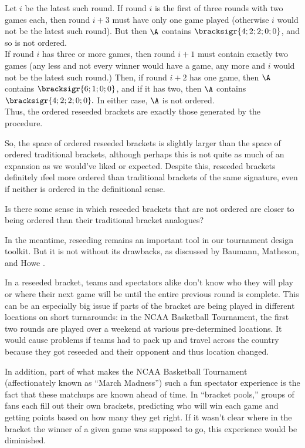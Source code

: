 {{        Let $i$ be the latest such round. If round $i$ is the first of three rounds with two games each, then round $i+3$ must have only one game played (otherwise $i$ would not be the latest such round). But then $\A$ contains $\bracksigr{4;2;2;0;0}$, and so is not ordered.\\
        
        If round $i$ has three or more games, then round $i+1$ must contain exactly two games (any less and not every winner would have a game, any more and $i$ would not be the latest such round.) Then, if round $i+2$ has one game, then $\A$ contains $\bracksigr{6;1;0;0}$, and if it has two, then $\A$ contains $\bracksigr{4;2;2;0;0}.$ In either case, $\A$ is not ordered.\\

        Thus, the ordered reseeded brackets are exactly those generated by the procedure.
    }{}

    So, the space of ordered reseeded brackets is slightly larger than the space of ordered traditional brackets, although perhaps this is not quite as much of an expansion as we would've liked or expected. Despite this, reseeded brackets definitely \i{feel} more ordered than traditional brackets of the same signature, even if neither is ordered in the definitional sense.

    \begin{oq}{}{}
        Is there some sense in which reseeded brackets that are not ordered are closer to being ordered than their traditional bracket analogues?
    \end{oq}

    In the meantime, reseeding remains an important tool in our tournament design toolkit. But it is not without its drawbacks, as discussed by Baumann, Matheson, and Howe \cite{reseeding_issues}. 

    In a reseeded bracket, teams and spectators alike don't know who they will play or where their next game will be until the entire previous round is complete. This can be an especially big issue if parts of the bracket are being played in different locations on short turnarounds: in the NCAA Basketball Tournament, the first two rounds are played over a weekend at various pre-determined locations. It would cause problems if teams had to pack up and travel across the country because they got reseeded and their opponent and thus location changed.

    In addition, part of what makes the NCAA Basketball Tournament (affectionately known as ``March Madness'') such a fun spectator experience is the fact that these matchups are known ahead of time. In ``bracket pools,'' groups of fans each fill out their own brackets, predicting who will win each game and getting points based on how many they get right. If it wasn't clear where in the bracket the winner of a given game was supposed to go, this experience would be diminished.

}
